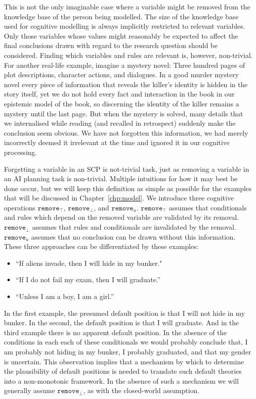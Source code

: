 This is not the only imaginable case where a variable might be removed from the knowledge base of the person being modelled. The size of the knowledge base used for cognitive modelling is always implicitly restricted to relevant variables. Only those variables whose values might reasonably be expected to affect the final conclusions drawn with regard to the research question should be considered. Finding which variables and rules are relevant is, however, non-trivial. For another real-life example, imagine a mystery novel: Three hundred pages of plot descriptions, character actions, and dialogues. In a good murder mystery novel every piece of information that reveals the killer's identity is hidden in the story itself, yet we do not hold every fact and interaction in the book in our epistemic model of the book, so discerning the identity of the killer remains a mystery until the last page. But when the mystery is solved, many details that we internalised while reading (and recalled in retrospect) suddenly make the conclusion seem obvious. We have not forgotten this information, we had merely incorrectly deemed it irrelevant at the time and ignored it in our cognitive processing.

Forgetting a variable in an SCP is not-trivial task, just as removing a variable in an AI planning task is non-trivial. Multiple intuitions for how it may best be done occur, but we will keep this definition as simple as possible for the examples that will be discussed in Chapter~\ref{chp:model}. We introduce three cognitive operations $\texttt{remove}_\top$, $\texttt{remove}_\bot$, and $\texttt{remove}_u$. $\texttt{remove}_\top$ assumes that conditionals and rules which depend on the removed variable are validated by its removal. $\texttt{remove}_\bot$ assumes that rules and conditionals are invalidated by the removal. $\texttt{remove}_u$ assumes that no conclusion can be drawn without this information.  These three approaches can be differentiated by these examples:

\begin{itemize}
\item ``If aliens invade, then I will hide in my bunker."
\item ``If I do not fail my exam, then I will graduate.''
\item ``Unless I am a boy, I am a girl.''
\end{itemize}

In the first example, the presumed default position is that I will not hide in my bunker. In the second, the default position is that I will graduate. And in the third example there is no apparent default position. In the absence of the conditions in each each of these conditionals we would probably conclude that, I am probably not hiding in my bunker, I probably graduated, and that my gender is uncertain. This observation implies that a mechanism by which to determine the plausibility of default positions is needed to translate such default theories into a non-monotonic framework. In the absence of such a mechanism we will generally assume $\texttt{remove}_\bot$, as with the closed-world assumption.

